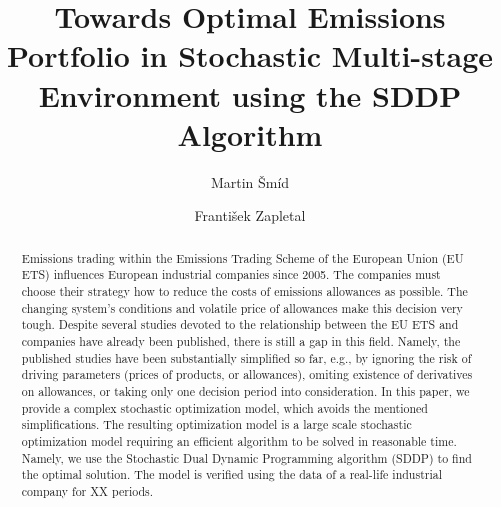 \documentclass[3p,times]{elsarticle}
\begin{document}
\begin{frontmatter}


\author{Martin \v Sm\' id}
\author{Franti\v sek Zapletal}

\dochead{}

\title{Towards Optimal Emissions Portfolio in Stochastic Multi-stage Environment using the SDDP Algorithm}

\address{Czech Academy of Sciences, Institute of Information Theory and Automation, Pod Vod\' arenskou v\v e\v z\' i 4, Prague, Czech Republic, smid@cas.utia.cz  }
\address{V\v SB -- Technical University of Ostrava, Sokolska 33, Ostrava, Czech Republic,
                frantisek.zapletal@vsb.cz  }

\begin{abstract}

Emissions trading within the Emissions Trading Scheme of the European Union (EU ETS) influences European industrial companies since 2005. The companies must choose their strategy how to reduce the costs of emissions allowances as possible. The changing system’s conditions and volatile price of allowances make this decision very tough. Despite several studies devoted to the relationship between the EU ETS and companies have already been published, there is still a gap in this field. Namely, the published studies have been substantially simplified so far, e.g., by ignoring the risk of driving parameters (prices of products, or allowances), omiting existence of derivatives on allowances, or taking only one decision period into consideration. In this paper, we provide a complex stochastic optimization model, which avoids the mentioned simplifications. The resulting optimization model is a large scale stochastic optimization model requiring an efficient algorithm to be solved in reasonable time. Namely, we use the Stochastic Dual Dynamic Programming algorithm (SDDP) to find the optimal solution. The model is verified using the data of a real-life industrial company for XX periods. 


\end{abstract}
\end{frontmatter}
\end{document}
